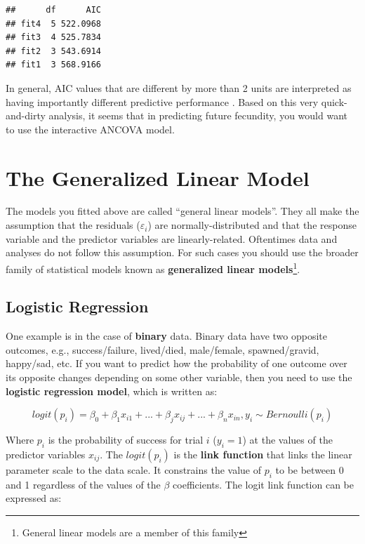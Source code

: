 \documentclass[]{book}
\let\rmarkdownfootnote\footnote%
\def\footnote{\protect\rmarkdownfootnote}
\theoremstyle{definition}
\theoremstyle{definition}
\theoremstyle{definition}
\theoremstyle{remark}
\begin{document}
\begin{verbatim}
##      df      AIC
## fit4  5 522.0968
## fit3  4 525.7834
## fit2  3 543.6914
## fit1  3 568.9166
\end{verbatim}

In general, AIC values that are different by more than 2 units are
interpreted as having importantly different predictive performance
\citep{aic-cite}. Based on this very quick-and-dirty analysis, it seems
that in predicting future fecundity, you would want to use the
interactive ANCOVA model.

\section{The Generalized Linear Model}\label{glms}

The models you fitted above are called ``general linear models''. They
all make the assumption that the residuals (\(\varepsilon_i\)) are
normally-distributed and that the response variable and the predictor
variables are linearly-related. Oftentimes data and analyses do not
follow this assumption. For such cases you should use the broader family
of statistical models known as \textbf{generalized linear
models}\footnote{General linear models are a member of this family}.

\subsection{Logistic Regression}\label{logis-regression}

One example is in the case of \textbf{binary} data. Binary data have two
opposite outcomes, e.g., success/failure, lived/died, male/female,
spawned/gravid, happy/sad, etc. If you want to predict how the
probability of one outcome over its opposite changes depending on some
other variable, then you need to use the \textbf{logistic regression
model}, which is written as:

\begin{equation}
  logit(p_i)=\beta_0 + \beta_1 x_{i1} + ... + \beta_j x_{ij}+ ... + \beta_n x_{in}, y_i \sim Bernoulli(p_i)
\label{eq:logis-reg}
\end{equation}

Where \(p_i\) is the probability of success for trial \(i\)
(\(y_i = 1\)) at the values of the predictor variables \(x_{ij}\). The
\(logit(p_i)\) is the \textbf{link function} that links the linear
parameter scale to the data scale. It constrains the value of \(p_i\) to
be between 0 and 1 regardless of the values of the \(\beta\)
coefficients. The logit link function can be expressed as:
\end{document}
